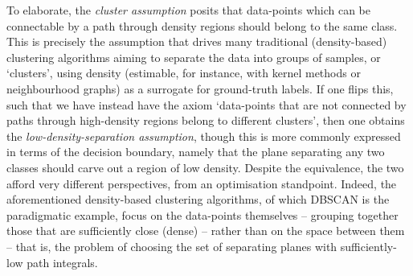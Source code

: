 To elaborate, the \emph{cluster assumption} posits that data-points which can be connectable by a
path through density regions should belong to the same class.
%
This is precisely the assumption that drives many traditional (density-based) clustering algorithms
aiming to separate the data into groups of samples, or `clusters', using density (estimable, for
instance, with kernel methods or neighbourhood graphs) as a surrogate for ground-truth labels.
%
 If one flips this, such that we have instead have the
axiom `data-points that are not connected by paths through high-density regions belong to different
clusters', then one obtains the \emph{low-density-separation assumption}, though this is more
commonly expressed in terms of the decision boundary, namely that the plane separating any two
classes should carve out a region of low density.
%
Despite the equivalence, the two afford very different perspectives, from an optimisation
standpoint. Indeed, the aforementioned density-based clustering algorithms, of which DBSCAN
\citep{ester1996density} is the paradigmatic example, focus on the data-points themselves --
grouping together those that are sufficiently close (dense) -- rather than on the space between
them -- that is, the problem of choosing the set of separating planes with sufficiently-low path
integrals.


